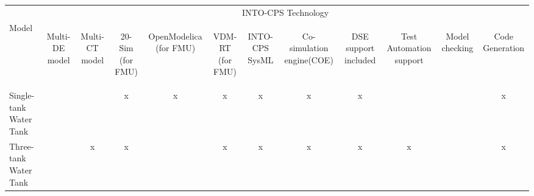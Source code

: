 \begin{table}[ht]
\begin{centering}
\begin{tabular}{|l|c|c|c|c|c|c|c|c|c|c|c|}\hline
  &\multicolumn{11}{c|}{INTO-CPS Technology} \\
\cline{2-12}
Model
&\begin{sideways}Multi-DE model\end{sideways}
&\begin{sideways}Multi-CT model\end{sideways}
&\begin{sideways}20-Sim (for FMU)\end{sideways}
&\begin{sideways}OpenModelica (for FMU)\end{sideways}
&\begin{sideways}VDM-RT (for FMU)\end{sideways}
&\begin{sideways}INTO-CPS SysML\end{sideways}  
&\begin{sideways}Co-simulation engine(COE)\end{sideways}
&\begin{sideways}DSE support included\end{sideways}
&\begin{sideways}{Test Automation support}\end{sideways}
&\begin{sideways}{Model checking}\end{sideways}
&\begin{sideways}{Code Generation}\end{sideways} \\
\hline
Single-tank Water Tank	& & &x&x&x&x&x&x& & &x\\ \hline
Three-tank Water Tank	& &x&x& &x&x&x&x&x& &x\\ \hline

\end{tabular}
\end{centering}
\end{table}
